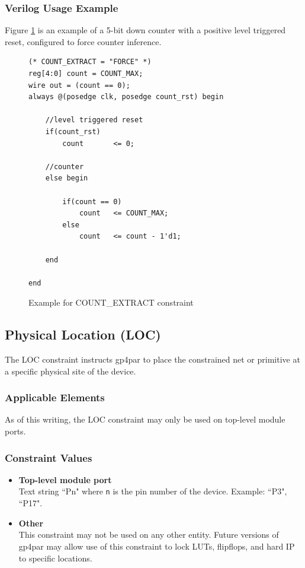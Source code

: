 \documentclass{article}
\begin{document}
\clearpage
\subsubsection{Verilog Usage Example}

Figure \ref{constraint-count-extract} is an example of a 5-bit down counter with a positive level triggered reset, 
configured to force counter inference.

\begin{figure}[h]
\begin{lstlisting}
(* COUNT_EXTRACT = "FORCE" *)
reg[4:0] count = COUNT_MAX;
wire out = (count == 0);
always @(posedge clk, posedge count_rst) begin
	
	//level triggered reset
	if(count_rst)
		count		<= 0;
	
	//counter
	else begin

		if(count == 0)
			count	<= COUNT_MAX;
		else
			count	<= count - 1'd1;

	end
	
end
\end{lstlisting}
\caption{Example for COUNT\_EXTRACT constraint}
\label{constraint-count-extract}
\end{figure}


\pagebreak
\subsection{Physical Location (LOC)}

The LOC constraint instructs gp4par to place the constrained net or primitive at a specific physical site of the 
device.

\subsubsection{Applicable Elements}
As of this writing, the LOC constraint may only be used on top-level module ports. 

\subsubsection{Constraint Values}
\begin{itemize}
\item {\bfseries Top-level module port}\\
Text string ``Pn" where \texttt{n} is the pin number of the device. Example: ``P3", ``P17".
\item {\bfseries Other} \\
This constraint may not be used on any other entity. Future versions of gp4par may allow use of this constraint 
to lock LUTs, flipflops, and hard IP to specific locations.
\end{itemize}
\end{document}
